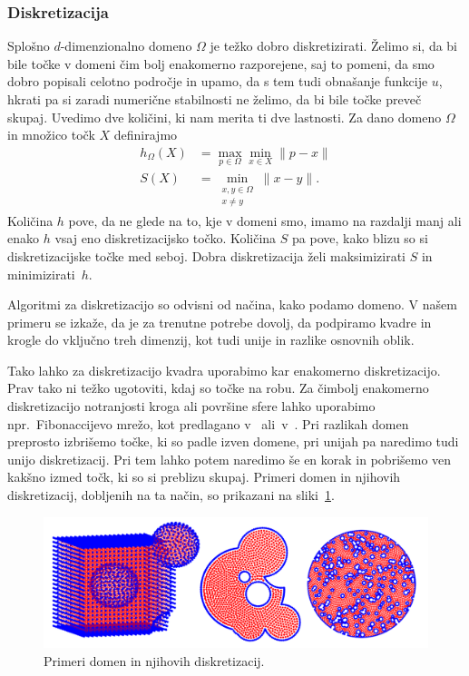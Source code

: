 \documentclass[12pt,a4paper,twoside]{article}
\theoremstyle{definition} %
\theoremstyle{plain} %
\numberwithin{equation}{section}
\begin{document}
\subsubsection{Diskretizacija}
Splošno $d$-dimenzionalno domeno $\Omega$ je težko dobro diskretizirati.
Želimo si, da bi bile točke v domeni čim bolj enakomerno razporejene, saj to
pomeni, da smo dobro popisali celotno področje in upamo, da s tem tudi obnašanje
funkcije $u$, hkrati pa si zaradi numerične stabilnosti ne želimo, da bi bile
točke preveč skupaj. Uvedimo dve količini, ki nam merita ti dve lastnosti.
Za dano domeno $\Omega$ in množico točk $X$ definirajmo
\begin{align}
  h_\Omega(X) &= \max_{p \in \Omega} \min_{x \in X} \|p - x\| \\
  \label{eq:def-hs}
  S(X) &= \min_{\substack{x, y \in \Omega \\ x \neq y}} \|x-y\|. \nonumber
\end{align}
Količina $h$ pove, da ne glede na to, kje v domeni smo, imamo na razdalji manj ali enako $h$
vsaj eno diskretizacijsko točko. Količina $S$ pa pove, kako blizu so si
diskretizacijske točke med seboj. Dobra diskretizacija želi maksimizirati $S$ in
minimizirati~$h$.

Algoritmi za diskretizacijo so odvisni od načina, kako podamo domeno.
V našem primeru se izkaže, da je za trenutne potrebe dovolj, da podpiramo
kvadre in krogle do vključno treh dimenzij, kot tudi unije in razlike
osnovnih oblik.

Tako lahko za diskretizacijo kvadra uporabimo kar enakomerno diskretizacijo.
Prav tako ni težko ugotoviti, kdaj so točke na robu. Za čimbolj enakomerno
diskretizacijo notranjosti kroga ali površine sfere
lahko uporabimo npr.~Fibonaccijevo mrežo, kot predlagano
v~\cite{hannay2004fibonacci} ali~v~\cite{gonzalez2010measurement}.
Pri razlikah domen preprosto izbrišemo točke, ki so padle izven domene,
pri unijah pa naredimo tudi unijo diskretizacij. Pri tem lahko potem naredimo še
en korak in pobrišemo ven kakšno izmed točk, ki so si preblizu skupaj.
Primeri domen in njihovih diskretizacij, dobljenih na ta način, so prikazani na sliki~\ref{fig:domains}.
\begin{figure}[!ht]
  \centering
  \includegraphics[width=\textwidth]{images/domains_generated.png}
  \caption{Primeri domen in njihovih diskretizacij.}
  \label{fig:domains}
\end{figure}
\end{document}

